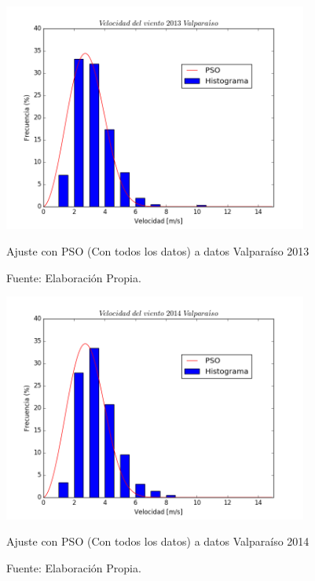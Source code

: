 \begin{figure}[h!]
    \centering
    \includegraphics[height=75mm]{figures/result_2013_fit_all_data.png}
    \caption{Ajuste con PSO (Con todos los datos) a datos Valparaíso 2013}
    \vspace{-.25cm}
    \caption*{Fuente: Elaboración Propia.}
    \label{fig:pso_valpo_13_all_data}
\end{figure}
\begin{figure}[h!]
    \centering
    \includegraphics[height=75mm]{figures/result_2014_fit_all_data.png}
    \caption{Ajuste con PSO (Con todos los datos) a datos Valparaíso 2014}
    \vspace{-.25cm}
    \caption*{Fuente: Elaboración Propia.}
    \label{fig:pso_valpo_14_all_data}
\end{figure}
